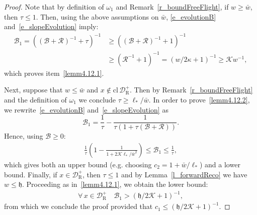 \documentclass[AHL, Unicode, longabstracts,published]{cedram}
\newcommand{\fa}{\forall\,}
\newcommand{\curv}{\kappa}
\newcommand{\cl}[1]{\mathrm{cl}\,#1}
\newcommand{\inv}{^{-1}}
\newcommand{\cB}{\mathcal{B}}
\newcommand{\cK}{\mathcal{K}}
\newcommand{\cpar}{\mathcal{R}}
\newcommand{\pslope}{\mathcal{B}}
\newcommand{\cell}{\mathcal{D}}
\newcommand{\privatel}[1]{#1_*}
\newcommand{\slopeb}{\mathfrak{h}}
\newcommand{\elll}{\privatel{\ell}}
\newcommand{\recoPrivate}{\mathrm{R}}
\newcommand{\backReco}{{\cell^+_{\recoPrivate}}}
\newcommand{\ppPrivate}[2]{#1^{#2}}
\newcommand{\prePrivate}[1]{\ppPrivate{#1}{-}}
\newcommand{\prpslope}{\prePrivate{\pslope}}
\newcommand{\llw}{\stackunder[1.2pt]{$w$}{\rule{.8ex}{.075ex}}}
\newcommand{\law}[1]{\omega_{#1}}
\renewcommand{\prpslope}{\cB}
\renewcommand{\llw}{\law{1}}
\renewcommand{\prpslope}{\cB}
\renewcommand{\prpslope}{\cB}
\let\oldforall\forall
\renewcommand*{\forall}{\mathrel{\oldforall}}
\begin{document}
\begin{proof}
Note that by definition of $\llw$ and Remark~\ref{r_boundFreeFlight}, if $w\geq \bar w$, then $\tau\leq 1$. Then, using the above assumptions on $\bar w$, \eqref{e_evolutionB} and~\eqref{e_slopeEvolution} imply:
\begin{align*}
\prpslope_{1} = \left((\prpslope+\cpar)\inv+\tau\right)\inv &\ge \left((\prpslope+\cpar)\inv+1\right)\inv\\
&\ge (\cpar\inv+1)\inv = \left(w/2\curv+1\right)\inv\ge
\cK w\inv,
\end{align*}
which proves item~\eqref{lemm4.12.1}.

Next, suppose that $w\leq \bar w$ and $x\not\in\cl\backReco$. Then by Remark~\ref{r_boundFreeFlight} and the definition of $\llw$ we conclude $\tau\geq\elll/\bar w$. In order to prove~\eqref{lemm4.12.2}, we rewrite~\eqref{e_evolutionB} and~\eqref{e_slopeEvolution} as
\begin{equation}\label{ElFr}
\prpslope_{1}=\frac{1}{\tau}-\frac{1}{\tau(1+\tau(\prpslope+\cpar))}.
\end{equation}
Hence, using $\prpslope\ge0$:
\begin{align*}
\frac{1}{\tau}\left(1-\frac{1}{1+2\cK\elll/\bar w^{2}}\right)\leq \prpslope_{1}\leq \frac{1}{\tau},
\end{align*}
which gives both an upper bound (e.g. choosing $c_{2} = 1+\bar w/\elll$) and a lower bound. Finally, if $x\in\backReco$, then $\tau\le 1$ and by Lemma~\ref{l_forwardReco} we have $w \le \slopeb$. Proceeding as in~\eqref{lemm4.12.1}, we obtain the lower bound:
\begin{align}\label{eq:backReco-lower-bound-for-B}
\fa x\in\backReco\quad \prpslope_{1} > (\slopeb/2\cK+1)\inv,
\end{align}
from which we conclude the proof provided that $c_1\le (\slopeb/2\cK+1)\inv$.
\end{proof}
\end{document}
